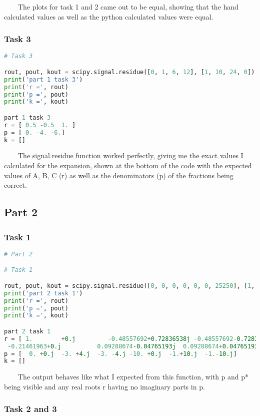 \documentclass[11pt,a4]{article}
\begin{document}
\ \ \ \ The plots for task 1 and 2 came out to be equal, showing that the hand calculated values as well as the python calculated values were equal.

\subsubsection{Task 3}

\begin{lstlisting}[language=Python]
# Task 3

rout, pout, kout = scipy.signal.residue([0, 1, 6, 12], [1, 10, 24, 0])
print('part 1 task 3')
print('r =', rout)
print('p =', pout)
print('k =', kout)

part 1 task 3
r = [ 0.5 -0.5  1. ]
p = [ 0. -4. -6.]
k = []
\end{lstlisting}

\ \ \ \ The signal.residue function worked perfectly, giving me the exact values I calculated for the expansion, shown at the bottom of the code with the expected values of A, B, C (r) as well as the denominators (p) of the fractions being correct.

\subsection{Part 2}

\subsubsection{Task 1}

\begin{lstlisting}[language=Python]
# Part 2

# Task 1

rout, pout, kout = scipy.signal.residue([0, 0, 0, 0, 0, 0, 25250], [1, 18, 218, 2036, 9085, 25250, 0])
print('part 2 task 1')
print('r =', rout)
print('p =', pout)
print('k =', kout)

part 2 task 1
r = [ 1.        +0.j         -0.48557692+0.72836538j -0.48557692-0.72836538j
 -0.21461963+0.j          0.09288674-0.04765193j  0.09288674+0.04765193j]
p = [  0. +0.j  -3. +4.j  -3. -4.j -10. +0.j  -1.+10.j  -1.-10.j]
k = []
\end{lstlisting}

\ \ \ \ The output behaves like what I expected from this function, with p and p* being visible and any real roots r having no imaginary parts in p.

\subsubsection{Task 2 and 3}
\end{document}
